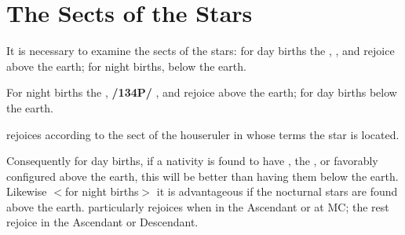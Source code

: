 \section{The Sects of the Stars}

It is necessary to examine the sects of the stars: for day births the \Sun, \Jupiter, and \Saturn\xspace rejoice above the earth; for night births, below the earth. 

For night births the \Moon, \textbf{/134P/} \Mars, and \Venus\xspace rejoice above the earth; for day births below the earth. 

\Mercury\xspace rejoices according to the sect of the houseruler in whose terms the star is located. 

Consequently for day births, if a nativity is found to have \Jupiter, the \Sun, or \Saturn favorably configured above the earth, this will be better than having them below the earth.
Likewise $<$for night births$>$ it is advantageous if the nocturnal stars are found above the earth. \Venus\xspace
particularly rejoices when in the Ascendant or at MC; the rest rejoice in the Ascendant or Descendant.

\newpage
